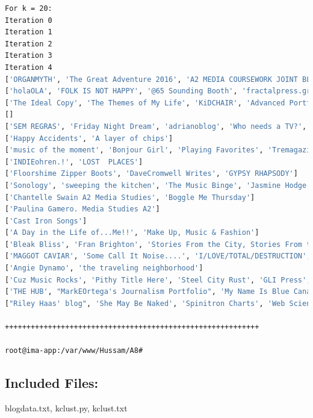 \documentclass[a4paper, 11pt]{article}
\begin{document}
\begin{lstlisting}[language=bash, breakatwhitespace=〈false), label=Running kclust.py, caption=Running kclust.py]
For k = 20:
Iteration 0
Iteration 1
Iteration 2
Iteration 3
Iteration 4
['ORGANMYTH', 'The Great Adventure 2016', 'A2 MEDIA COURSEWORK JOINT BLOG', 'Music-Drop Magazine', 'MTJR RANTS & RAVES ON MUSIC', 'macthemost', 'Myopiamuse']
['holaOLA', 'FOLK IS NOT HAPPY', '@65 Sounding Booth', 'fractalpress.gr', '~ mavaffantastico ~', 'Everything Starts With an A...', "MarkFisher's-MusicReview"]
['The Ideal Copy', 'The Themes of My Life', 'KiDCHAIR', 'Advanced Portfolio - Josh Pamfilo - Candidate Number 2186 - Centre Number 16607 - A2 Media Studies']
[]
['SEM REGRAS', 'Friday Night Dream', 'adrianoblog', 'Who needs a TV?', 'Out of my Mind']
['Happy Accidents', 'A layer of chips']
['music of the moment', 'Bonjour Girl', 'Playing Favorites', 'Tremagazine']
['INDIEohren.!', 'LOST  PLACES']
['Floorshime Zipper Boots', 'DaveCromwell Writes', 'GYPSY RHAPSODY']
['Sonology', 'sweeping the kitchen', 'The Music Binge', 'Jasmine Hodge']
['Chantelle Swain A2 Media Studies', 'Boggle Me Thursday']
['Paulina Gamero. Media Studies A2']
['Cast Iron Songs']
['A Day in the Life of...Me!!', 'Make Up, Music & Fashion']
['Bleak Bliss', 'Fran Brighton', 'Stories From the City, Stories From the Sea', 'Lost in the Shuffle', 'IoTube     :)', 'One Stunning Single Egg']
['MAGGOT CAVIAR', 'Some Call It Noise....', 'I/LOVE/TOTAL/DESTRUCTION', 'F-Measure', 'Encore', 'Revolver USA Distribution & Midheaven mailorder', 'guardtheguardians']
['Angie Dynamo', 'the traveling neighborhood']
['Cuz Music Rocks', 'Pithy Title Here', 'Steel City Rust', 'GLI Press', 'Stephanie Veto Photography', 'Stonehill Sketchbook', 'a duchess nonethelesss', 'jaaackie.', 'nonsense a la mode', "Pirate's Log", "i'm in too truthful a mood", 'Beyond the pond', 'Mile In Mine', 'bittersweet', 'Rants from the Pants', 'STATUS', "She's mad but she's magic. There's no lie in her fire.", 'simone goes']
['THE HUB', "MarkEOrtega's Journalism Portfolio", 'My Name Is Blue Canary', 'from a voice plantation', 'If You Give a Girl a Camera...', 'The Campus Buzz on WSOU', 'Hip In Detroit', "It'll Glow On You"]
["Riley Haas' blog", 'She May Be Naked', 'Spinitron Charts', 'Web Science and Digital Libraries Research Group', 'Did Not Chart', 'Eli Jace | The Mind Is A Terrible Thing To Paste', '*Sixeyes: by Alan Williamson', 'The Stark Online', 'Cherry Area']

+++++++++++++++++++++++++++++++++++++++++++++++++++++++++++

root@ima-app:/var/www/Hussam/A8#
\end{lstlisting}

\subsection*{Included Files:}
blogdata.txt, kclust.py, kclust.txt
\end{document}
